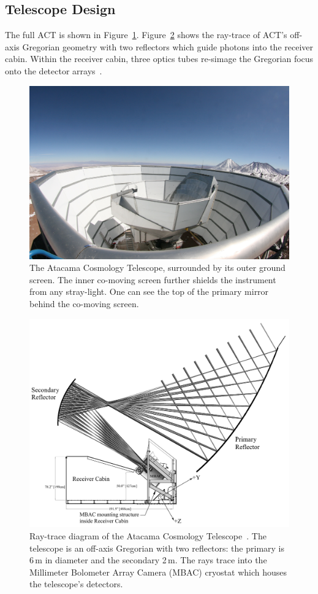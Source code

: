 \subsection{Telescope Design}
The full ACT is shown in Figure~\ref{fig:act_site}.  Figure~\ref{fig:act_inst} shows the ray-trace of ACT's off-axis Gregorian geometry with two reflectors which guide photons into the receiver cabin.  Within the receiver cabin, three optics tubes re-simage the Gregorian focus onto the detector arrays~\cite{thornton_2016}.

\begin{figure}
    \centering
    \includegraphics[width = .6\textwidth]{Figures/act_inst_close.jpeg}
    \caption{The Atacama Cosmology Telescope, surrounded by its outer ground screen. The inner co-moving screen further shields the instrument from any stray-light.  One can see the top of the primary mirror behind the co-moving screen.}
    \label{fig:act_site}
\end{figure}

\begin{figure}[t]
    \centering
    \includegraphics[width = .8\textwidth]{Figures/act_inst.pdf}
    \caption{Ray-trace diagram of the Atacama Cosmology Telescope~\cite{act_inst}.  The telescope is an off-axis Gregorian with two reflectors: the primary is 6\,m in diameter and the secondary 2\,m.  The rays trace into the Millimeter Bolometer Array Camera (MBAC) cryostat which houses the telescope's detectors.}
    \label{fig:act_inst}
\end{figure}

